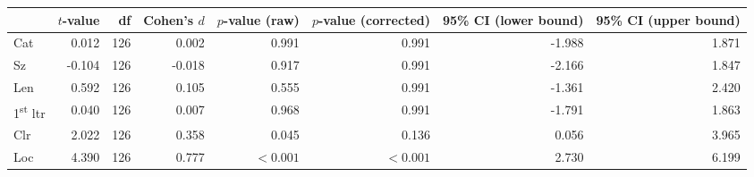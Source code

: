 \begin{tabular}{lrrrrrrr}
\toprule
 & $t$-value & df & Cohen's $d$ & $p$-value (raw) & $p$-value (corrected) & 95\% CI (lower bound) & 95\% CI (upper bound) \\
\midrule
 Cat & 0.012 & 126 & 0.002 & 0.991 & 0.991 & -1.988 & 1.871 \\
 Sz & -0.104 & 126 & -0.018 & 0.917 & 0.991 & -2.166 & 1.847 \\
 Len & 0.592 & 126 & 0.105 & 0.555 & 0.991 & -1.361 & 2.420 \\
 1\textsuperscript{st} ltr & 0.040 & 126 & 0.007 & 0.968 & 0.991 & -1.791 & 1.863 \\
\rowcolor[HTML]{f5f5f5} Clr & 2.022 & 126 & 0.358 & 0.045 & 0.136 & 0.056 & 3.965 \\
\rowcolor[HTML]{fffee3} Loc & 4.390 & 126 & 0.777 & $< 0.001$ & $< 0.001$ & 2.730 & 6.199 \\
\bottomrule
\end{tabular}